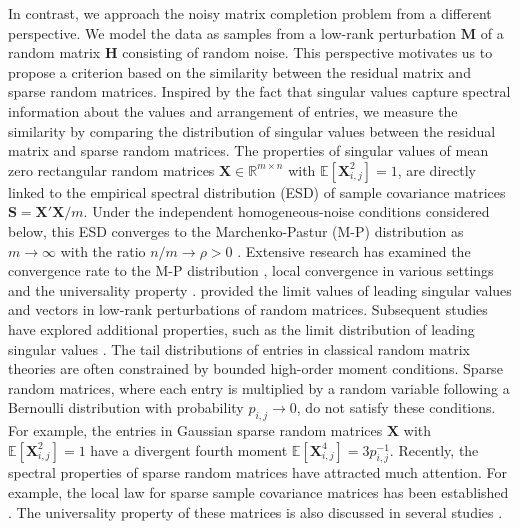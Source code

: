 \documentclass[numsec,webpdf,modern,large,namedate]{oup-authoring-template}
\theoremstyle{plain}
\theoremstyle{remark}
\newcommand{\M}{\bm{M}}
\newcommand{\bH}{\bm{H}}
\begin{document}
In contrast, we approach the noisy matrix completion problem from a different perspective.
We model the data as samples from a low-rank perturbation $\M$ of a random matrix $\bH$ consisting of random noise. This perspective motivates us to propose a criterion based on the similarity between the residual matrix and sparse random matrices. Inspired by the fact that singular values capture spectral information about the values and arrangement of entries, we measure the similarity by comparing the distribution of singular values between the residual matrix and sparse random matrices.
The properties of singular values of mean zero rectangular random matrices $\bm{X}\in\mathbb{R}^{m\times n}$ with $\mathbb{E}[\bm{X}^2_{i,j}] = 1$, are directly linked to the empirical spectral distribution (ESD) of sample covariance matrices $\bm{S} = \bm{X}'\bm{X}/m$. Under the independent homogeneous-noise conditions considered below, this ESD converges to the Marchenko-Pastur (M-P) distribution as $m \rightarrow \infty$ with the ratio $n/m \rightarrow \rho > 0$ \citep{yin1986limit,bai1988necessary}.
Extensive research has examined the convergence rate to the M-P distribution \citep{gotze2004rate,gotze2011rate,bai2012convergence}, local convergence in various settings \citep{bourgade2014local,alt2017local,bao2017local} and the universality property \citep{erdos2010bulk,erdHos2012rigidity,tao2012random,pillai2014universality}.
\cite{benaych2012singular} provided the limit values of leading singular values and vectors in low-rank perturbations of random matrices. Subsequent studies have explored additional properties, such as the limit distribution of leading singular values \citep{veraart2016denoising,bao2021singular,bao2022statistical}. The tail distributions of entries in classical random matrix theories are often constrained by bounded high-order moment conditions.
Sparse random matrices, where each entry is multiplied by a random variable following a Bernoulli distribution with probability $p_{i,j}\rightarrow 0$, do not satisfy these conditions.
For example, the entries in Gaussian sparse random matrices $\bm{X}$ with $\mathbb{E}[\bm{X}^2_{i,j}] = 1$ have a divergent fourth moment $\mathbb{E}[\bm{X}^4_{i,j}] = 3p_{i,j}^{-1}$.
Recently, the spectral properties of sparse random matrices have attracted much attention. For example, the local law for sparse sample covariance matrices has been established \citep{lee2021higher,gotze2022local,kafetzopoulos2023local}. The universality property of these matrices is also discussed in several studies \citep{ding2018necessary,he2023edge,brailovskaya2024universality}.
\end{document}
